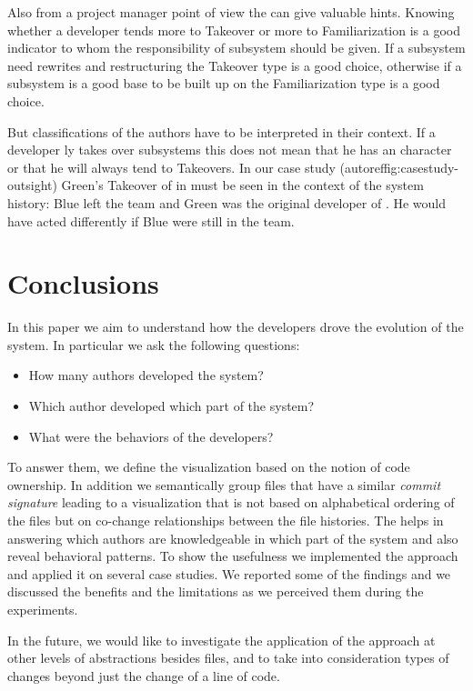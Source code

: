 Also from a project manager point of view the \omap can give valuable hints. Knowing whether a developer tends more to  Takeover or more to Familiarization is a good indicator to whom the responsibility of subsystem should be given. If a subsystem need rewrites and restructuring the Takeover type is a good choice, otherwise if a subsystem is a good base to be built up on the Familiarization type is a good choice.

But classifications of the authors have to be interpreted in their context. If a developer ly takes over subsystems this does not mean that he has an  character or that he will always tend to Takeovers. In our case study (autoref{fig:casestudy-outsight}) Green's Takeover of  in  must be seen in the context of the system history: Blue left the team and Green was the original developer of . He would have acted differently if Blue were still in the team.

\section{Conclusions}\label{sec:conclusions}

In this paper we aim to understand how the developers drove the evolution of the system. In particular we ask the following questions:
\begin{itemize}
\item How many authors developed the system?
\item Which author developed which part of the system?
\item What were the behaviors of the developers?
\end{itemize}

To answer them, we define the \omap visualization based on the notion of code ownership. In addition we semantically group files that have a similar \emph{commit signature} leading to a visualization that is not  based on alphabetical ordering of the files but on co-change relationships between the file histories. The \omap helps in answering which authors are knowledgeable in which part of the system and also reveal behavioral patterns. To show the usefulness we implemented the approach and applied it on several case studies. We reported some of the findings and we discussed the benefits and the limitations as we perceived them during the experiments.

In the future, we would like to investigate the application of the approach at other levels of abstractions besides files, and to take into consideration types of changes beyond just the change of a line of code.

